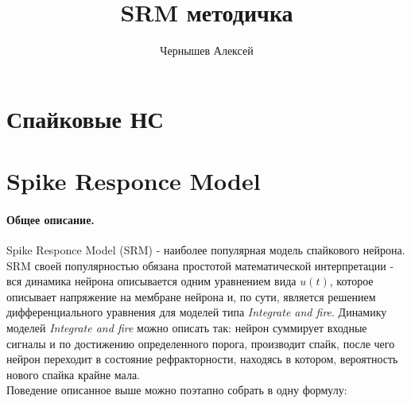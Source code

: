 \documentclass[a4paper,10pt]{article}
\title{SRM методичка}
\author{Чернышев Алексей}
\begin{document}
\section*{Спайковые НС}
\section*{Spike Responce Model}
\paragraph*{Общее описание. }Spike Responce Model (SRM) - наиболее популярная модель спайкового нейрона. SRM своей популярностью обязана простотой математической интерпретации - вся динамика нейрона описывается одним уравнением вида $u(t)$, которое описывает напряжение на мембране нейрона и, по сути, является решением дифференциального уравнения для моделей типа \textit{Integrate and fire}. Динамику моделей \textit{Integrate and fire} можно описать так: нейрон суммирует входные сигналы и по достижению определенного порога, производит спайк, после чего нейрон переходит в состояние рефракторности, находясь в котором, вероятность нового спайка крайне мала.\\
\indent Поведение описанное выше можно поэтапно собрать в одну формулу: 
\end{document}
